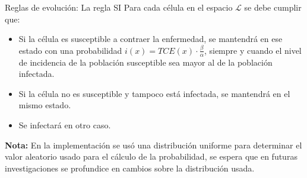 \documentclass[9pt]{beamer}
\begin{document}
\begin{frame}{Reglas de evolución: La regla SI}
Para cada célula en el espacio $\mathcal{L}$ se debe cumplir que:
\begin{itemize}
    \item Si la célula es susceptible a contraer la enfermedad, se mantendrá en ese estado con una probabilidad $i(x)=TCE(x)\cdot\frac{\beta}{\alpha}$, siempre y cuando el nivel de incidencia de la población susceptible sea mayor al de la población infectada.
    \item Si la célula no es susceptible y tampoco está infectada, se mantendrá en el mismo estado.
    \item Se infectará en otro caso.
\end{itemize}

\textbf{Nota:} En la implementación se usó una distribución uniforme para determinar el valor aleatorio usado para el cálculo de la probabilidad, se espera que en futuras investigaciones se profundice en cambios sobre la distribución usada.
\end{frame}
\end{document}
